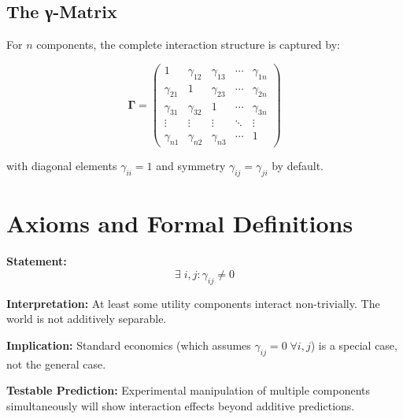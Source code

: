 \subsection{The γ-Matrix}

For $n$ components, the complete interaction structure is captured by:

\begin{equation}
\mathbf{\Gamma} = \begin{pmatrix}
1 & \gamma_{12} & \gamma_{13} & \cdots & \gamma_{1n} \\
\gamma_{21} & 1 & \gamma_{23} & \cdots & \gamma_{2n} \\
\gamma_{31} & \gamma_{32} & 1 & \cdots & \gamma_{3n} \\
\vdots & \vdots & \vdots & \ddots & \vdots \\
\gamma_{n1} & \gamma_{n2} & \gamma_{n3} & \cdots & 1
\end{pmatrix}
\label{eq:how-gamma-matrix}
\end{equation}

with diagonal elements $\gamma_{ii} = 1$ and symmetry $\gamma_{ij} = \gamma_{ji}$ by default.


\section{Axioms and Formal Definitions}
\label{sec:how-axioms}

\begin{tcolorbox}[colback=gray!5!white, colframe=gray!75!black,
    title=Axiom UNMAPPED_CMP-1: Existence of Interaction]
\textbf{Statement:}
\begin{equation}
\exists \; i, j: \gamma_{ij} \neq 0
\end{equation}

\textbf{Interpretation:} At least some utility components interact non-trivially.
The world is not additively separable.

\textbf{Implication:} Standard economics (which assumes $\gamma_{ij} = 0 \; \forall i,j$)
is a special case, not the general case.

\textbf{Testable Prediction:} Experimental manipulation of multiple components
simultaneously will show interaction effects beyond additive predictions.
\end{tcolorbox}

